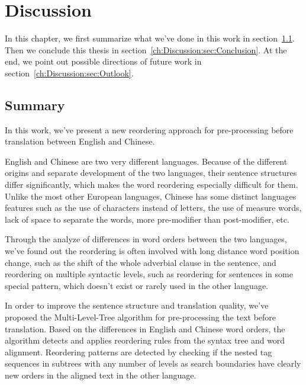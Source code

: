 

\chapter{Discussion}
\label{ch:Discussion}

In this chapter, we first summarize what we've done in this work in section~\ref{ch:Discussion:sec:Summary}. Then we conclude this thesis in section~\ref{ch:Discussion:sec:Conclusion}. At the end, we point out possible directions of future work in section~\ref{ch:Discussion:sec:Outlook}.

\section{Summary}
\label{ch:Discussion:sec:Summary}

In this work, we've present a new reordering approach for pre-processing before translation between English and Chinese.

English and Chinese are two very different languages. Because of the different origins and separate development of the two languages, their sentence structures differ significantly, which makes the word reordering especially difficult for them. Unlike the most other European languages, Chinese has some distinct languages features such as the use of characters instead of letters, the use of measure words, lack of space to separate the words, more pre-modifier than post-modifier, etc.

Through the analyze of differences in word orders between the two languages, we've found out the reordering is often involved with long distance word position change, such as the shift of the whole adverbial clause in the sentence, and reordering on multiple syntactic levels, such as reordering for sentences in some special pattern, which doesn't exist or rarely used in the other language.

In order to improve the sentence structure and translation quality, we've proposed the Multi-Level-Tree algorithm for pre-processing the text before translation. Based on the differences in English and Chinese word orders, the algorithm detects and applies reordering rules from the syntax tree and word alignment. Reordering patterns are detected by checking if the nested tag sequences in subtrees with any number of levels as search boundaries have clearly new orders in the aligned text in the other language.

